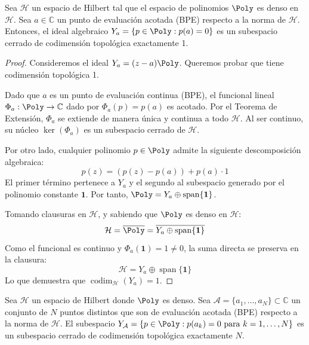 \begin{prop}
	Sea $\mathcal{H}$ un espacio de Hilbert tal que el espacio de polinomios $\Poly$ es denso en $\mathcal{H}$. Sea $a \in \mathbb{C}$ un punto de evaluación acotada (BPE) respecto a la norma de $\mathcal{H}$. Entonces, el ideal algebraico $Y_a = \{p \in \Poly : p(a) = 0\}$ es un subespacio cerrado de codimensión topológica exactamente 1.
\end{prop}

\begin{proof}
	Consideremos el ideal $Y_a = (z-a)\Poly$. Queremos probar que tiene codimensión topológica 1.

	Dado que $a$ es un punto de evaluación continua (BPE), el funcional lineal $\Phi_a: \Poly \to \mathbb{C}$ dado por $\Phi_a(p) = p(a)$ es acotado. Por el Teorema de Extensión, $\Phi_a$ se extiende de manera única y continua a todo $\mathcal{H}$. Al ser continuo, su núcleo $\ker(\Phi_a)$ es un subespacio cerrado de $\mathcal{H}$.

	Por otro lado, cualquier polinomio $p \in \Poly$ admite la siguiente descomposición algebraica:
	$$p(z) = (p(z) - p(a)) + p(a) \cdot 1$$
	El primer término pertenece a $Y_a$ y el segundo al subespacio generado por el polinomio constante $\mathbf{1}$. Por tanto, $\Poly = Y_a \oplus \operatorname{span}\{\mathbf{1}\}$.

	Tomando clausuras en $\mathcal{H}$, y sabiendo que $\Poly$ es denso en $\mathcal{H}$:
	$$\mathcal{H} = \overline{\Poly} = \overline{Y_a \oplus \operatorname{span}\{\mathbf{1}\}}$$
	Como el funcional es continuo y $\Phi_a(\mathbf{1}) = 1 \neq 0$, la suma directa se preserva en la clausura:
	$$\mathcal{H} = Y_a \oplus \operatorname{span}\{\mathbf{1}\}$$
	Lo que demuestra que $\operatorname{codim}_{\mathcal{H}}(Y_a) = 1$.
\end{proof}

\begin{prop}
	Sea $\mathcal{H}$ un espacio de Hilbert donde $\Poly$ es denso. Sea $\mathcal{A} = \{a_1, \dots, a_N\} \subset \mathbb{C}$ un conjunto de $N$ puntos distintos que son de evaluación acotada (BPE) respecto a la norma de $\mathcal{H}$. El subespacio $Y_{\mathcal{A}} = \{p \in \Poly : p(a_k) = 0 \text{ para } k=1,\dots,N\}$ es un subespacio cerrado de codimensión topológica exactamente $N$.
\end{prop}

